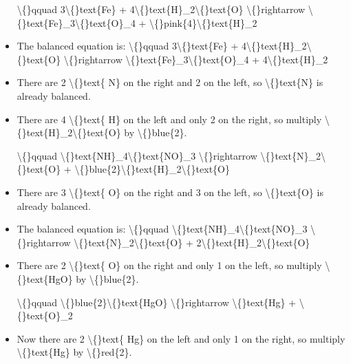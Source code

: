 \documentclass{article}
\begin{document}
\begin{itemize}
                    \textbackslash\{\}qquad
                        3\textbackslash\{\}text\{Fe\} + 4\textbackslash\{\}text\{H\}\_2\textbackslash\{\}text\{O\} \textbackslash\{\}rightarrow \textbackslash\{\}text\{Fe\}\_3\textbackslash\{\}text\{O\}\_4 + \textbackslash\{\}pink\{4\}\textbackslash\{\}text\{H\}\_2
  \item The balanced equation is:
                    \textbackslash\{\}qquad
                        3\textbackslash\{\}text\{Fe\} + 4\textbackslash\{\}text\{H\}\_2\textbackslash\{\}text\{O\} \textbackslash\{\}rightarrow \textbackslash\{\}text\{Fe\}\_3\textbackslash\{\}text\{O\}\_4 + 4\textbackslash\{\}text\{H\}\_2
  \item There are 2 \textbackslash\{\}text\{ N\} on the right and
                    2 on the left, so \textbackslash\{\}text\{N\}
                    is already balanced.
  \item There are 4 \textbackslash\{\}text\{ H\} on the left and
                        only 2 on the right, so multiply
                        \textbackslash\{\}text\{H\}\_2\textbackslash\{\}text\{O\} by \textbackslash\{\}blue\{2\}.
                    
                    \textbackslash\{\}qquad
                        \textbackslash\{\}text\{NH\}\_4\textbackslash\{\}text\{NO\}\_3 \textbackslash\{\}rightarrow \textbackslash\{\}text\{N\}\_2\textbackslash\{\}text\{O\} + \textbackslash\{\}blue\{2\}\textbackslash\{\}text\{H\}\_2\textbackslash\{\}text\{O\}
  \item There are 3 \textbackslash\{\}text\{ O\} on the right and
                    3 on the left, so \textbackslash\{\}text\{O\}
                    is already balanced.
  \item The balanced equation is:
                    \textbackslash\{\}qquad
                        \textbackslash\{\}text\{NH\}\_4\textbackslash\{\}text\{NO\}\_3 \textbackslash\{\}rightarrow \textbackslash\{\}text\{N\}\_2\textbackslash\{\}text\{O\} + 2\textbackslash\{\}text\{H\}\_2\textbackslash\{\}text\{O\}
  \item There are 2 \textbackslash\{\}text\{ O\} on the right and
                        only 1 on the left, so multiply
                        \textbackslash\{\}text\{HgO\} by \textbackslash\{\}blue\{2\}.
                    
                    \textbackslash\{\}qquad
                        \textbackslash\{\}blue\{2\}\textbackslash\{\}text\{HgO\} \textbackslash\{\}rightarrow \textbackslash\{\}text\{Hg\} + \textbackslash\{\}text\{O\}\_2
  \item Now there are 2 \textbackslash\{\}text\{ Hg\} on the left and
                        only 1 on the right, so multiply
                        \textbackslash\{\}text\{Hg\} by \textbackslash\{\}red\{2\}.
                    

\end{itemize}
\end{document}
